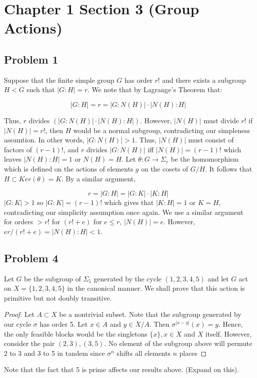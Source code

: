 \documentclass[12pt]{article}
\begin{document}
\section{Chapter 1 Section 3 (Group Actions)}

\subsection{Problem 1}
Suppose that the finite simple group $G$ has order $r!$ and there exists a subgroup $H < G$ such that 
$|G : H | = r$. We note that by Lagrange's Theorem that:

$$ |G:H| = r = |G : N(H)| \cdot |N(H) : H|$$
 
Thus, $r$ divides $(|G : N(H)| \cdot |N(H) : H|)$. However, $|N(H)|$ must divide $r!$ if $|N(H)| = r!$, then
$H$ would be a normal subgroup, contradicting our simpleness assumtion. In other words, $|G:N(H)| > 1$. Thus, $|N(H)|$ must consist of factors of $(r-1)!$, and $r$ divides $|G:N(H)|$ iff $|N(H)| = (r-1)!$ which leaves $|N(H) : H|  = 1$ or $N(H) = H$. Let $\theta: G \rightarrow \Sigma_r$ be the homomorphism which is defined on the actions of elements $g$ on the cosets of $G/H$. It follows that $H \subset Ker(\theta) = K$. By a similar argument,

$$ r = |G:H| = |G:K|\cdot |K:H| $$ 
 $|G:K| > 1$ so $|G:K| = (r-1)!$ which gives that $|K : H| = 1$ or $K = H$, contradicting our simplicity assumption once again. We use a similar argument for orders $> r!$ for $(r! + e)$ for $e\leq r$, $|N(H)| = e$. However, $er/(r!+e) = |N(H) : H| < 1$.
 
 
\subsection{Problem 4}

Let $G$ be the subgroup of $\Sigma_5$ generated by the cycle $(1,2,3,4,5)$ and let $G$ act on $X = \{1,2,3,4,5 \}$ in the canonical manner. We shall prove that this action is primitive but not doubly transitive.

\begin{proof}
Let $A \subset X$ be a nontrivial subset. Note that the subgroup generated by our cycle $\sigma$ has order 5.
Let $x \in A$ and $y \in X/A$. Then $\sigma^{|x-y|}(x) = y$. Hence, the only feasible blocks would be the singletons $\{x\}, x \in X$ and $X$ itself. However, consider the pair $(2,3), (3,5)$. No element of the subgroup above will permute 2 to 3 and 3 to 5 in tandem since $\sigma^n$ shifts all elements $n$
 places 
 \end{proof}
 
Note that the fact that 5 is prime affects our results above. (Expand on this).

  
\end{document}
